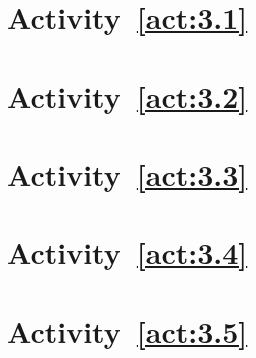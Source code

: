 \section{Activity~\ref{act:3.1}}



\section{Activity~\ref{act:3.2}}



\section{Activity~\ref{act:3.3}}



\section{Activity~\ref{act:3.4}}



\section{Activity~\ref{act:3.5}}


